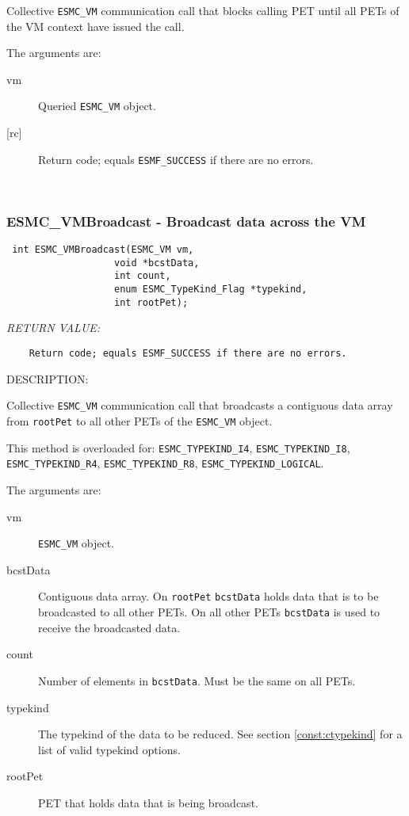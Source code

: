   
    Collective {\tt ESMC\_VM} communication call that blocks calling PET until 
    all PETs of the VM context have issued the call.
  
    The arguments are:
    \begin{description}
    \item[vm] 
      Queried {\tt ESMC\_VM} object.
    \item[{[rc]}]
      Return code; equals {\tt ESMF\_SUCCESS} if there are no errors.
    \end{description}
   
 
\mbox{}\hrulefill\ 
 
\subsubsection [ESMC\_VMBroadcast] {ESMC\_VMBroadcast - Broadcast data across the VM}


  
\begin{verbatim} int ESMC_VMBroadcast(ESMC_VM vm,
                   void *bcstData,
                   int count,
                   enum ESMC_TypeKind_Flag *typekind,
                   int rootPet);\end{verbatim}{\em RETURN VALUE:}
\begin{verbatim}    Return code; equals ESMF_SUCCESS if there are no errors.\end{verbatim}
{\sf DESCRIPTION:\\ }


    Collective {\tt ESMC\_VM} communication call that broadcasts a contiguous 
    data array from {\tt rootPet} to all other PETs of the {\tt ESMC\_VM}
    object.
  
    This method is overloaded for:
    {\tt ESMC\_TYPEKIND\_I4}, {\tt ESMC\_TYPEKIND\_I8},
    {\tt ESMC\_TYPEKIND\_R4}, {\tt ESMC\_TYPEKIND\_R8}, 
    {\tt ESMC\_TYPEKIND\_LOGICAL}.
  
    The arguments are:
    \begin{description}
    \item[vm] 
      {\tt ESMC\_VM} object.
    \item[bcstData]
      Contiguous data array. On {\tt rootPet} {\tt bcstData} holds data that
      is to be broadcasted to all other PETs. On all other PETs 
      {\tt bcstData} is used to receive the broadcasted data.
    \item[count] 
      Number of elements in {\tt bcstData}. Must be the same on all PETs.
    \item[typekind]
      The typekind of the data to be reduced. See section 
      \ref{const:ctypekind} for a list of valid typekind options.
    \item[rootPet] 
      PET that holds data that is being broadcast.
    \end{description}
   
